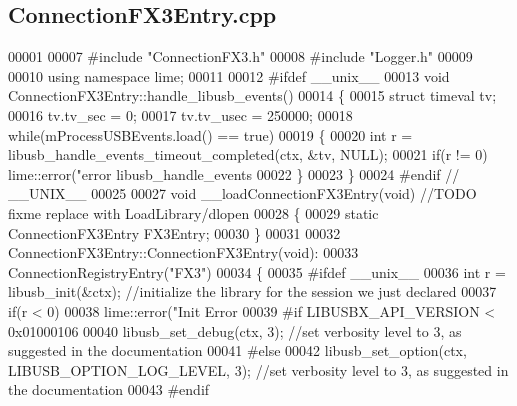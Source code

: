 \subsection{Connection\+F\+X3\+Entry.\+cpp}
\label{ConnectionFX3Entry_8cpp_source}

\begin{DoxyCode}
00001 
00007 \textcolor{preprocessor}{#include "ConnectionFX3.h"}
00008 \textcolor{preprocessor}{#include "Logger.h"}
00009 
00010 \textcolor{keyword}{using namespace }lime;
00011 
00012 \textcolor{preprocessor}{#ifdef \_\_unix\_\_}
00013 \textcolor{keywordtype}{void} ConnectionFX3Entry::handle\_libusb\_events()
00014 \{
00015     \textcolor{keyword}{struct }timeval tv;
00016     tv.tv\_sec = 0;
00017     tv.tv\_usec = 250000;
00018     \textcolor{keywordflow}{while}(mProcessUSBEvents.load() == \textcolor{keyword}{true})
00019     \{
00020         \textcolor{keywordtype}{int} r = libusb\_handle\_events\_timeout\_completed(ctx, &tv, NULL);
00021         \textcolor{keywordflow}{if}(r != 0) lime::error(\textcolor{stringliteral}{"error libusb\_handle\_events %
00022     \}
00023 \}
00024 \textcolor{preprocessor}{#endif // \_\_UNIX\_\_}
00025 
00027 \textcolor{keywordtype}{void} __loadConnectionFX3Entry(\textcolor{keywordtype}{void}) \textcolor{comment}{//TODO fixme replace with LoadLibrary/dlopen}
00028 \{
00029 \textcolor{keyword}{static} ConnectionFX3Entry FX3Entry;
00030 \}
00031 
00032 ConnectionFX3Entry::ConnectionFX3Entry(\textcolor{keywordtype}{void}):
00033     ConnectionRegistryEntry(\textcolor{stringliteral}{"FX3"})
00034 \{
00035 \textcolor{preprocessor}{#ifdef \_\_unix\_\_}
00036     \textcolor{keywordtype}{int} r = libusb\_init(&ctx); \textcolor{comment}{//initialize the library for the session we just declared}
00037     \textcolor{keywordflow}{if}(r < 0)
00038         lime::error(\textcolor{stringliteral}{"Init Error %
00039 \textcolor{preprocessor}{#if LIBUSBX\_API\_VERSION < 0x01000106}
00040     libusb\_set\_debug(ctx, 3); \textcolor{comment}{//set verbosity level to 3, as suggested in the documentation}
00041 \textcolor{preprocessor}{#else}
00042     libusb\_set\_option(ctx, LIBUSB\_OPTION\_LOG\_LEVEL, 3); \textcolor{comment}{//set verbosity level to 3, as suggested in the
       documentation}
00043 \textcolor{preprocessor}{#endif}
}}
\end{DoxyCode}
